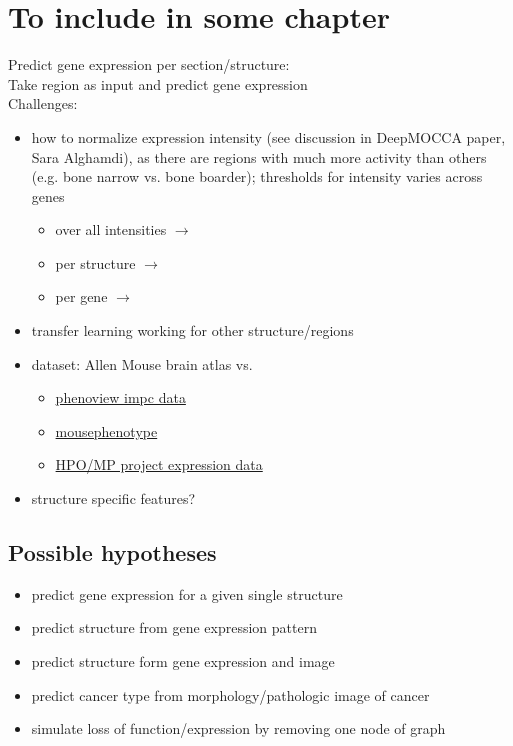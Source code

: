 \documentclass[]{article}
\begin{document}
\section*{To include in some chapter}
Predict gene expression per section/structure:\\
Take region as input and predict gene expression\\
Challenges:
\begin{itemize}
	\item how to normalize expression intensity (see discussion in DeepMOCCA paper, Sara Alghamdi), as there are regions with much more activity than others (e.g. bone narrow vs. bone boarder); thresholds for intensity varies across genes
	
	\begin{itemize}
		\item over all intensities $\rightarrow$
		\item per structure $\rightarrow$  
		\item per gene $\rightarrow$ 
	\end{itemize}
	\item transfer learning working for other structure/regions
	\item dataset: Allen Mouse brain atlas vs. 
	\begin{itemize}
		\item \href{https://www.har.mrc.ac.uk/harwell-news/phenoview-new-tool-compare-impc-data/}{phenoview impc data}
		
		\item \href{https://www.mousephenotype.org/}{mousephenotype}
		
		\item \href{http://www.informatics.jax.org/expression.shtml}{HPO/MP project expression data}
	\end{itemize}
	\item structure specific features?
\end{itemize}

\subsection*{Possible hypotheses}
\begin{itemize}
	\item predict gene expression for a given single structure
	\item predict structure from gene expression pattern
	\item predict structure form gene expression and image
	\item predict cancer type from morphology/pathologic image of cancer
	\item simulate loss of function/expression by removing one node of graph
\end{itemize}
\end{document}
